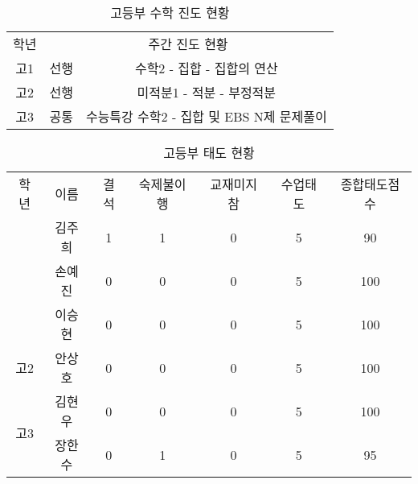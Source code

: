 \documentclass[idxtotoc,hyperref,openany]{labbook} %
\begin{document}


\begin{table}[h]
\centering
\begin{adjustbox}{width=.9\textwidth}
\begin{tabular}{c||c|c}
\toprule
\midrule
학년 & \multicolumn{2}{c}{주간 진도 현황} \\
\hhline{=||==}
고1 & 선행 & 수학2 -  집합 - 집합의 연산 \\
\hline
고2 & 선행 & 미적분1 - 적분 - 부정적분\\
\hline
\multirow{1}{*}{고3} & 공통 & 수능특강 수학2 - 집합 및 EBS N제 문제풀이 \\

\hline
\end{tabular}
\end{adjustbox}
\caption{\label{tab:ii} 고등부 수학 진도 현황 }
\end{table}





\begin{table}[H]
\centering
\begin{adjustbox}{width=\textwidth}
\begin{tabular}{c|c||c|c|c|c|c}
\toprule
\midrule
학년 & 이름 & 결석 & 숙제불이행 & 교재미지참 & 수업태도 & 종합태도점수 \\
\hhline{=|=||=|=|=|=|=}
\multirow{3}{*}{고1}			& 김주희 & 1 & 1 & 0 & 5 & 90   \\ \hhline{~------}
					& 손예진 & 0 & 0 & 0 & 5 & 100  \\ \hhline{~------}
					& 이승현 & 0 & 0 & 0 & 5 & 100  \\
\hline
\multirow{1}{*}{고2}			& 안상호 & 0 & 0 & 0 & 5 & 100	\\ 
\hline
\multirow{2}{*}{고3}			& 김현우 & 0 & 0 & 0 & 5 & 100  \\ \hhline{~------}
					& 장한수 & 0 & 1 & 0 & 5 & 95	\\
\hline
\end{tabular}
\end{adjustbox}
\caption{\label{tab:iii} 고등부 태도 현황 }
\end{table}

\end{document}
